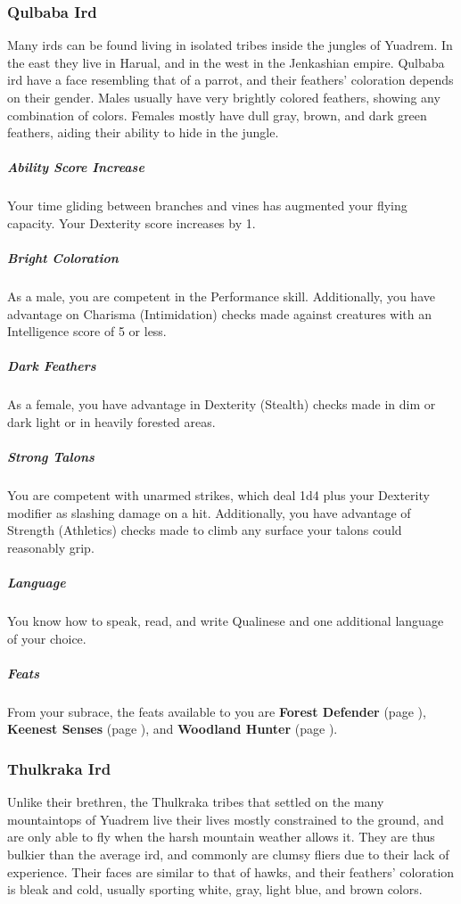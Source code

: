 \subsubsection{Qulbaba Ird}
    Many irds can be found living in isolated tribes inside the jungles of Yuadrem.
    In the east they live in Harual, and in the west in the Jenkashian empire.
    Qulbaba ird have a face resembling that of a parrot, and their feathers' coloration depends on their gender.
    Males usually have very brightly colored feathers, showing any combination of colors.
    Females mostly have dull gray, brown, and dark green feathers, aiding their ability to hide in the jungle.

    \subparagraph{Ability Score Increase} Your time gliding between branches and vines has augmented your flying capacity.
    Your Dexterity score increases by 1.

    \subparagraph{Bright Coloration} As a male, you are competent in the Performance skill.
    Additionally, you have advantage on Charisma (Intimidation) checks made against creatures with an Intelligence score of 5 or less.

    \subparagraph{Dark Feathers} As a female, you have advantage in Dexterity (Stealth) checks made in dim or dark light or in heavily forested areas.

    \subparagraph{Strong Talons} You are competent with unarmed strikes, which deal 1d4 plus your Dexterity modifier as slashing damage on a hit.
    Additionally, you have advantage of Strength (Athletics) checks made to climb any surface your talons could reasonably grip.

    \subparagraph{Language} You know how to speak, read, and write Qualinese and one additional language of your choice.

    \subparagraph{Feats} From your subrace, the feats available to you are
    \textbf{Forest Defender} (page \pageref{feat::forestdefender}),
    \textbf{Keenest Senses} (page \pageref{feat::keenestsenses}), and
    \textbf{Woodland Hunter} (page \pageref{feat::woodlandhunter}).


\subsubsection{Thulkraka Ird}
    Unlike their brethren, the Thulkraka tribes that settled on the many mountaintops of Yuadrem live their lives mostly constrained to the ground, and are only able to fly when the harsh mountain weather allows it.
    They are thus bulkier than the average ird, and commonly are clumsy fliers due to their lack of experience.
    Their faces are similar to that of hawks, and their feathers' coloration is bleak and cold, usually sporting white, gray, light blue, and brown colors.

